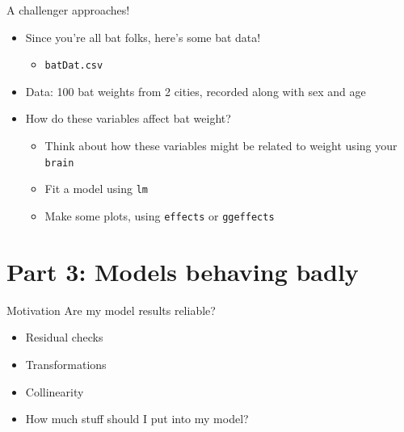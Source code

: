\documentclass[
  ignorenonframetext,
  aspectratio=169]{beamer}
\providecommand{\tightlist}{%
  \setlength{\itemsep}{0pt}\setlength{\parskip}{0pt}}
\begin{document}
\begin{frame}[fragile]{A challenger approaches!}
\protect\hypertarget{a-challenger-approaches-1}{}
\begin{itemize}[<+->]
\tightlist
\item
  Since you're all bat folks, here's some bat data!

  \begin{itemize}[<+->]
  \tightlist
  \item
    \texttt{batDat.csv}
  \end{itemize}
\item
  Data: 100 bat weights from 2 cities, recorded along with sex and age
\item
  How do these variables affect bat weight?

  \begin{itemize}[<+->]
  \tightlist
  \item
    Think about how these variables might be related to weight using
    your \texttt{brain}
  \item
    Fit a model using \texttt{lm}
  \item
    Make some plots, using \texttt{effects} or \texttt{ggeffects}
  \end{itemize}
\end{itemize}
\end{frame}

\hypertarget{part-3-models-behaving-badly}{%
\section{Part 3: Models behaving
badly}\label{part-3-models-behaving-badly}}

\begin{frame}{Motivation}
\protect\hypertarget{motivation-2}{}
Are my model results reliable?

\begin{itemize}[<+->]
\tightlist
\item
  Residual checks
\item
  Transformations
\item
  Collinearity
\item
  How much stuff should I put into my model?
\end{itemize}
\end{frame}
\end{document}
